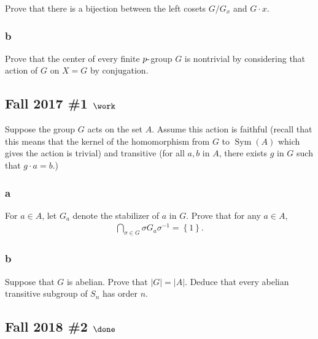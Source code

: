 Prove that there is a bijection between the left cosets \(G/G_x\) and
\(G\cdot x\).

\hypertarget{b-15}{%
\subsubsection{b}\label{b-15}}

Prove that the center of every finite \(p{\hbox{-}}\)group \(G\) is
nontrivial by considering that action of \(G\) on \(X=G\) by
conjugation.

\hypertarget{fall-2017-1-work}{%
\subsection{\texorpdfstring{Fall 2017 \#1
\(\work\)}{Fall 2017 \#1 \textbackslash work}}\label{fall-2017-1-work}}

Suppose the group \(G\) acts on the set \(A\). Assume this action is
faithful (recall that this means that the kernel of the homomorphism
from \(G\) to \(\operatorname{Sym}(A)\) which gives the action is
trivial) and transitive (for all \(a, b\) in \(A\), there exists \(g\)
in \(G\) such that \(g \cdot a = b\).)

\hypertarget{a-16}{%
\subsubsection{a}\label{a-16}}

For \(a \in A\), let \(G_a\) denote the stabilizer of \(a\) in \(G\).
Prove that for any \(a \in A\),
\begin{align*}
\bigcap_{\sigma\in G} \sigma G_a \sigma^{-1}= \left\{{1}\right\}
.\end{align*}

\hypertarget{b-16}{%
\subsubsection{b}\label{b-16}}

Suppose that \(G\) is abelian. Prove that \(|G| = |A|\). Deduce that
every abelian transitive subgroup of \(S_n\) has order \(n\).

\hypertarget{fall-2018-2-done}{%
\subsection{\texorpdfstring{Fall 2018 \#2
\(\done\)}{Fall 2018 \#2 \textbackslash done}}\label{fall-2018-2-done}}

